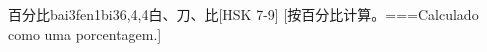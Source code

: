 \begin{EntryWithPhonetic}{百分比}{bai3fen1bi3}{6,4,4}{⽩、⼑、⽐}[HSK 7-9]
  [按百分比计算。===Calculado como uma porcentagem.]
\end{EntryWithPhonetic}
